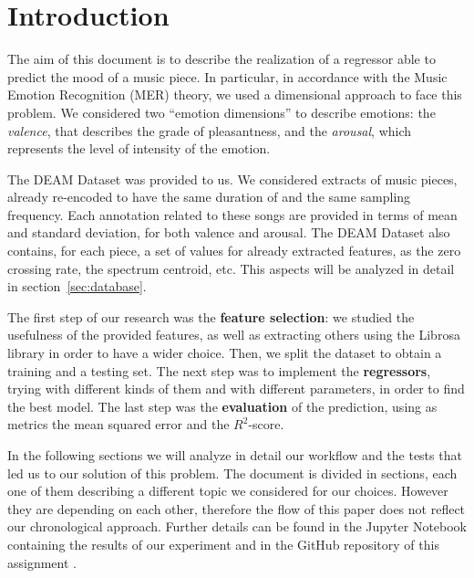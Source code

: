 \section{Introduction}

The aim of this document is to describe the realization of a regressor able to predict the mood of a music piece. In particular, in accordance with the Music Emotion Recognition (MER) theory, we used a dimensional approach to face this problem. We considered two ``emotion dimensions'' to describe emotions: the \emph{valence}, that describes the grade of pleasantness, and the \emph{arousal}, which represents the level of intensity of the emotion.

The DEAM Dataset was provided to us. We considered extracts of music pieces, already re-encoded to have the same duration of and the same sampling frequency.
Each annotation related to these songs are provided in terms of mean and standard deviation, for both valence and arousal.
The DEAM Dataset also contains, for each piece, a set of values for already extracted features, as the zero crossing rate, the spectrum centroid, etc. This aspects will be analyzed in detail in section~\ref{sec:database}.

The first step of our research was the \textbf{feature selection}: we studied the usefulness of the provided features, as well as extracting others using the Librosa library in order to have a wider choice. Then, we split the dataset to obtain a training and a testing set. The next step was to implement the \textbf{regressors}, trying with different kinds of them and with different parameters, in order to find the best model. The last step was the \textbf{evaluation} of the prediction, using as metrics the mean squared error and the $R^2$-score.

In the following sections we will analyze in detail our workflow and the tests that led us to our solution of this problem. The document is divided in sections, each one of them describing a different topic we considered for our choices. However they are depending on each other, therefore the flow of this paper does not reflect our chronological approach. Further details can be found in the Jupyter Notebook containing the results of our experiment \cite{notebook} and in the GitHub repository of this assignment \cite{github}.

